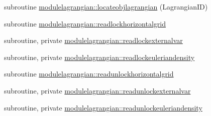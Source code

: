 \begin{DoxyCompactItemize}
\item 
subroutine \mbox{\hyperlink{namespacemodulelagrangian_a42e447276e6e4455d7699fb38f9d67f0}{modulelagrangian\+::locateobjlagrangian}} (Lagrangian\+ID)
\item 
subroutine \mbox{\hyperlink{namespacemodulelagrangian_a94ace2d6de2898ec24d8cd3f4ccd1292}{modulelagrangian\+::readlockhorizontalgrid}}
\item 
subroutine, private \mbox{\hyperlink{namespacemodulelagrangian_a1be97a0d8bb95c907adf6f985c3a70ce}{modulelagrangian\+::readlockexternalvar}}
\item 
subroutine, private \mbox{\hyperlink{namespacemodulelagrangian_a3d2b3737568ce2b7e2998cbd2192c685}{modulelagrangian\+::readlockeuleriandensity}}
\item 
subroutine \mbox{\hyperlink{namespacemodulelagrangian_ae9f8ce72f32e9ce362df2b72ff4b672d}{modulelagrangian\+::readunlockhorizontalgrid}}
\item 
subroutine, private \mbox{\hyperlink{namespacemodulelagrangian_afc1c234aa5939835cbe1bc80abe16766}{modulelagrangian\+::readunlockexternalvar}}
\item 
subroutine, private \mbox{\hyperlink{namespacemodulelagrangian_a62c1768ee36cf2fc50c44c595fbf0408}{modulelagrangian\+::readunlockeuleriandensity}}
\end{DoxyCompactItemize}

